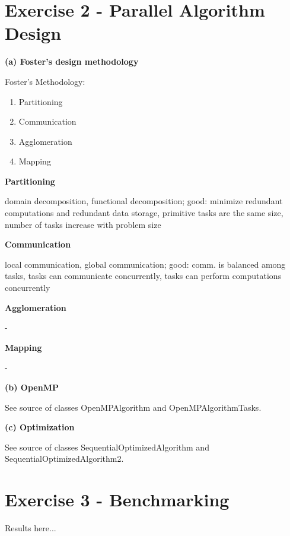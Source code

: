 \documentclass[a4paper,twoside,11pt]{article}
\begin{document}
\section{Exercise 2 - Parallel Algorithm Design}
\textbf{(a) Foster's design methodology}

Foster's Methodology:
\begin{enumerate}
	\item Partitioning
	\item Communication
	\item Agglomeration
	\item Mapping
\end{enumerate}

\textbf{Partitioning}

domain decomposition, functional decomposition; good: minimize redundant computations and redundant data storage, primitive tasks are the same size, number of tasks increase with problem size

\textbf{Communication}

local communication, global communication; good: comm. is balanced among tasks, tasks can communicate concurrently, tasks can perform computations concurrently

\textbf{Agglomeration}

-

\textbf{Mapping}

-

\textbf{(b) OpenMP}

See source of classes OpenMPAlgorithm and OpenMPAlgorithmTasks.

\textbf{(c) Optimization}

See source of classes SequentialOptimizedAlgorithm and SequentialOptimizedAlgorithm2.

\section{Exercise 3 - Benchmarking}

Results here...
\end{document}
